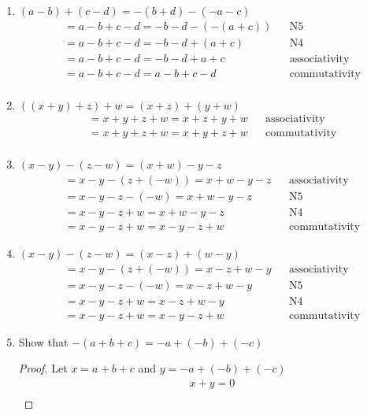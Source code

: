\documentclass{article}
\begin{document}
\begin{enumerate}
\begin{align*}
	 &= a - b + c - d = -b - d + a + c	&&\text{associativity} \\
	 &= a - b + c - d = a - b + c - d	&&\text{commutativity} \\
	\end{align*}
\item $(a - b) + (c - d) = -(b + d) - (-a - c)$
	\begin{align*}
	 &= a - b + c - d = -b - d - (-(a+c))		&&\text{N5} \\
	 &= a - b + c - d = -b - d + (a+c)		&&\text{N4} \\
	 &= a - b + c - d = -b - d + a + c		&&\text{associativity} \\
	 &= a - b + c - d = a - b + c - d		&&\text{commutativity} \\
	\end{align*}
\item $((x + y) + z) + w = (x + z) + (y + w)$
	\begin{align*}
	 &= x + y + z + w = x + z + y + w		&&\text{associativity} \\
	 &= x + y + z + w = x + y + z + w		&&\text{commutativity} \\
	\end{align*}
\item $(x - y) - (z - w) = (x + w) - y - z$
	\begin{align*}
	 &= x - y - (z + (-w)) = x + w - y - z	&&\text{associativity} \\
	 &= x - y - z - (-w) = x + w - y - z		&&\text{N5} \\
	 &= x - y - z + w = x + w - y - z		&&\text{N4} \\
	 &= x - y - z + w = x - y - z + w		&&\text{commutativity}
	\end{align*}
\item $(x - y) - (z - w) = (x - z) + (w - y)$
	\begin{align*}
	 &= x - y - (z + (-w)) = x - z + w - y	&&\text{associativity} \\
	 &= x - y - z - (-w) = x - z + w - y		&&\text{N5} \\
	 &= x - y - z + w = x - z + w - y		&&\text{N4} \\
	 &= x - y - z + w = x - y - z + w		&&\text{commutativity}
	\end{align*}
\item Show that $-(a+b+c) = -a + (-b) + (-c)$
\begin{proof}
Let $x = a+b+c$ and $y = -a + (-b) + (-c)$
\begin{align*}
&x + y = 0 \\

\end{align*}
\end{proof}
\end{enumerate}
\end{document}
